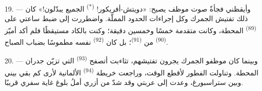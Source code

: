 19. --- وأيقظني فجأةً صوت موظف يصيح: «دويتش-أفريكور!
\textsuperscript{(*)} الجميع يبدّلون!» كان ذلك تفتيش الجمرك وكل إجراءات الحدود
المملّة. واضطررت إلى ضبط ساعتي على  \textsuperscript{(89)} المحطة،
وكانت متقدمة خمسًا وخمسين دقيقة؛ وكنت بالكاد مستيقظًا فلم أكد أميّز
 \textsuperscript{(90)} من  \textsuperscript{(91)}؛
بل كان  \textsuperscript{(92)} نفسه مطموسًا بضباب الصباح.

20. --- وبينما كان موظفو الجمرك يجرون تفتيشهم، تثاءبت أتصفح
 \textsuperscript{(93)} التي تزيّن جدران المحطة. وتناولت الفطور
لأقطع الوقت، وراجعت خريطة  \textsuperscript{(94)} الألمانية لأرى كم
بقي بيني وبين ستراسبورغ، وعدت إلى عربتي وقد شدّ من أزري أملُ بلوغ غاية
سفري قريبًا.
\VUsaut{6.0mm}
\VUfilet{22mm}
